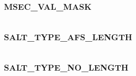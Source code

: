 \documentclass[letterpaper,10pt,english]{sphinxmanual}
\begin{document}
\subsubsection{MSEC\_VAL\_MASK}
\label{appdev/refs/macros/MSEC_VAL_MASK:msec-val-mask-data}\label{appdev/refs/macros/MSEC_VAL_MASK::doc}\label{appdev/refs/macros/MSEC_VAL_MASK:msec-val-mask}

\begin{fulllineitems}
\label{appdev/refs/macros/MSEC_VAL_MASK:MSEC_VAL_MASK}
\end{fulllineitems}


\begin{tabulary}{\linewidth}{|L|L|}
\hline

 & 
\\
\hline\end{tabulary}



\subsubsection{SALT\_TYPE\_AFS\_LENGTH}
\label{appdev/refs/macros/SALT_TYPE_AFS_LENGTH::doc}\label{appdev/refs/macros/SALT_TYPE_AFS_LENGTH:salt-type-afs-length-data}\label{appdev/refs/macros/SALT_TYPE_AFS_LENGTH:salt-type-afs-length}

\begin{fulllineitems}
\label{appdev/refs/macros/SALT_TYPE_AFS_LENGTH:SALT_TYPE_AFS_LENGTH}
\end{fulllineitems}


\begin{tabulary}{\linewidth}{|L|L|}
\hline

 & 
\\
\hline\end{tabulary}



\subsubsection{SALT\_TYPE\_NO\_LENGTH}
\label{appdev/refs/macros/SALT_TYPE_NO_LENGTH:salt-type-no-length-data}\label{appdev/refs/macros/SALT_TYPE_NO_LENGTH::doc}\label{appdev/refs/macros/SALT_TYPE_NO_LENGTH:salt-type-no-length}
\end{document}
